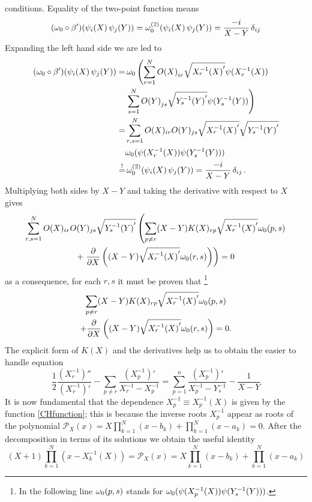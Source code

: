 conditions. Equality of the two-point function means
\[
(\omega_0 \circ \beta')(\psi_i(X)\,\psi_j(Y))=
\omega_0^{(2)}(\psi_i(X)\,\psi_j(Y))=\frac{-i}{X-Y}\,\delta_{ij} 
\]
Expanding the left hand side we are led to
\begin{align*}
(\omega_0 \circ \beta')(\psi_i(X)\,\psi_j(Y))=&\,
\omega_0\left(\sum_{r=1}^N{O(X)}_{ir}\sqrt{{X_r^{-1}(X)}'}
\psi(X_r^{-1}(X))\right.\\ 
& \left.\sum_{s=1}^N{O(Y)}_{js}\sqrt{{Y_s^{-1}(Y)}'}
\psi(Y_s^{-1}(Y))\right)\\   
=&\sum_{r,s=1}^N O(X)_{ir} O(Y)_{js}\sqrt{{X_r^{-1}(X)}'}
\sqrt{{Y_s^{-1}(Y)}'}\\ 
&\omega_0(\psi(X_r^{-1}(X))\psi(Y_s^{-1}(Y)))\\ 
\overset{!}{=}&\,\omega_0^{(2)}(\psi_i(X)\,\psi_j(Y))
=\frac{-i}{X-Y}\,\delta_{ij}\,.
\end{align*}
Multiplying both sides by $X-Y$ and taking the 
derivative with respect to $X$ gives 
\begin{multline*}
\sum_{r,s=1}^N O(X)_{ir} O(Y)_{js} \sqrt{{Y_s^{-1}(Y)}'}
\left(\sum_{p\neq r} (X-Y)K(X)_{rp}\sqrt{{X_r^{-1}(X)}'}
\omega_0(p,s)\right. \\
+ \left.\frac{\partial}{\partial X}\left( (X-Y)\sqrt{{X_r^{-1}(X)}'}
\omega_0(r,s)\right)\right)=0
\end{multline*}
as a consequence, for each $r,s$ it must be proven that
\footnote{In the following line $\omega_0(p,s)$ stands for
$\omega_0(\psi(X_p^{-1}(X))\psi(Y_s^{-1}(Y)))$.}
\begin{multline*}
\sum_{p\neq r} (X-Y)K(X)_{rp}\sqrt{{X_r^{-1}(X)}'}
\omega_0(p,s)\\
+\frac{\partial}{\partial X}\left( (X-Y)\sqrt{{X_r^{-1}(X)}'}
\omega_0(r,s)\right)=0.
\end{multline*}
The explicit form of $K(X)$ and the derivatives 
help us to obtain the easier to handle equation
\begin{equation}
\label{finalns}
\frac{1}{2}\frac{(X_r^{-1})''}{(X_r^{-1})'}-\sum_{p\neq r}
\frac{(X_p^{-1})'}{X_r^{-1}-X_p^{-1}}=
\sum_{p=1}^n \frac{(X_p^{-1})'}{X_p^{-1}-Y_s^{-1}}
-\frac{1}{X-Y}
\end{equation}
It is now fundamental that the dependence $X_p^{-1}\equiv
X_p^{-1}(X)$ is given by the function \eqref{CHfunction};
this is because the inverse roots $X_p^{-1}$ appear as roots
of the polynomial ${\mathcal{P}}_X(x)= X\prod_{k=1}^N(x-b_k)+
\prod_{k=1}^N(x-a_k)=0$. After the decomposition in terms of 
its solutions we obtain the useful identity
\[
(X+1)\prod_{k=1}^N (x-X_k^{-1}(X)) = 
{\mathcal{P}}_X(x)= X\prod_{k=1}^N(x-b_k)+
\prod_{k=1}^N(x-a_k)
\]
